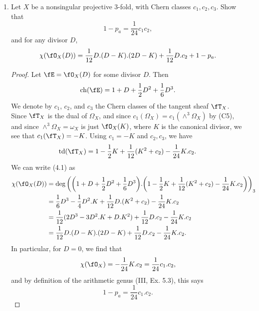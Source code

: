 \documentclass[a4paper]{article}
\begin{document}
\begin{enumerate} [label=\textbf{\arabic*.}, leftmargin=0em]
      \begin{proof}
            
      \end{proof}

      \item Let $X$ be a nonsingular projective 3-fold, with Chern classes $c_1, c_2, c_3$.
      Show that
      \begin{equation*}
            1 - p_a = \frac{1}{24} c_1 c_2,
      \end{equation*}
      and for any divisor $D$,
      \begin{equation*}
            \chi(\fO_X(D)) = \frac{1}{12}D.(D - K).(2D - K) + \frac{1}{12} D.c_2 + 1 - p_a.
      \end{equation*}

      \begin{proof}
           Let $\fE = \fO_X(D)$ for some divisor $D$.
           Then
           \begin{equation*}
            \chern(\fE) = 1 + D + \frac{1}{2}D^2 + \frac{1}{6}D^3.
           \end{equation*}
           We denote by $c_1$, $c_2$, and $c_3$ the Chern classes of the tangent sheaf $\fT_X$.
           Since $\fT_X$ is the dual of $\Omega_X$, and since $c_1(\Omega_X) = c_1(\wedge^3 \Omega_X)$ by (C5), and since $\wedge^3 \Omega_X = \omega_X$ is just $\fO_X(K)$, where $K$ is the canonical divisor, we see that $c_1(\fT_X) = -K$.
           Using $c_1 = -K$ and $c_2, c_3$, we have
           \begin{equation*}
            \todd(\fT_X) = 1 - \frac{1}{2}K + \frac{1}{12}(K^2 + c_2) - \frac{1}{24}K.c_2.
           \end{equation*}
           We can write (4.1) as
           \begin{align*}
            \chi(\fO_X(D)) & = \deg\bigg( \bigg(1 + D + \frac{1}{2}D^2 + \frac{1}{6}D^3 \bigg) . \bigg( 1 - \frac{1}{2}K + \frac{1}{12}(K^2 + c_2) - \frac{1}{24}K.c_2 \bigg)\bigg)_3 \\
            & = \frac{1}{6}D^3 - \frac{1}{4}D^2.K + \frac{1}{12}D.(K^2 + c_2) - \frac{1}{24}K.c_2 \\
            & = \frac{1}{12}(2D^3 - 3D^2.K + D.K^2) + \frac{1}{12}D.c_2 - \frac{1}{24}K.c_2 \\
            & = \frac{1}{12}D.(D - K).(2D - K) + \frac{1}{12}D.c_2 - \frac{1}{24}K.c_2.
           \end{align*}
           In particular, for $D = 0$, we find that
           \begin{equation*}
            \chi(\fO_X) = -\frac{1}{24}K.c_2 = \frac{1}{24}c_1.c_2,
           \end{equation*}
           and by definition of the arithmetic genus (III, Ex. 5.3), this says
           \begin{equation*}
            1 - p_a = \frac{1}{24}c_1.c_2.
           \end{equation*}
      \end{proof}


\end{enumerate}
\end{document}
